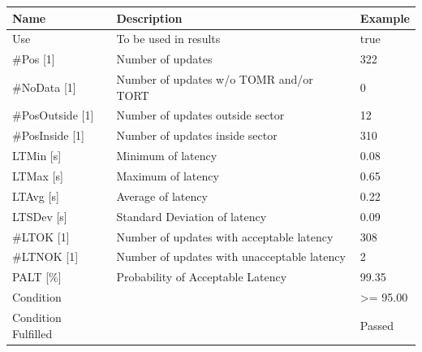 \begin{center}
 \begin{table}[H]
  \begin{tabularx}{\textwidth}{ | l | X |  l | }
    \hline
    \textbf{Name} & \textbf{Description} & \textbf{Example} \\ \hline
    Use & To be used in results & true \\ \hline
    \#Pos [1] & Number of updates & 322 \\ \hline
    \#NoData [1] & Number of updates w/o TOMR and/or TORT & 0 \\ \hline
    \#PosOutside [1] & Number of updates outside sector & 12 \\ \hline
    \#PosInside [1] & Number of updates inside sector & 310 \\ \hline
    LTMin [s] & Minimum of latency & 0.08 \\ \hline
    LTMax [s] & Maximum of latency & 0.65 \\ \hline
    LTAvg [s] & Average of latency & 0.22 \\ \hline
    LTSDev [s] & Standard Deviation of latency & 0.09 \\ \hline
    \#LTOK [1] & Number of updates with acceptable latency & 308 \\ \hline
    \#LTNOK [1] & Number of updates with unacceptable latency & 2 \\ \hline
    PALT [\%] & Probability of Acceptable Latency & 99.35 \\ \hline
    Condition &  & >= 95.00 \\ \hline
    Condition Fulfilled &  & Passed \\ \hline
\end{tabularx}
\end{table}
\end{center}
